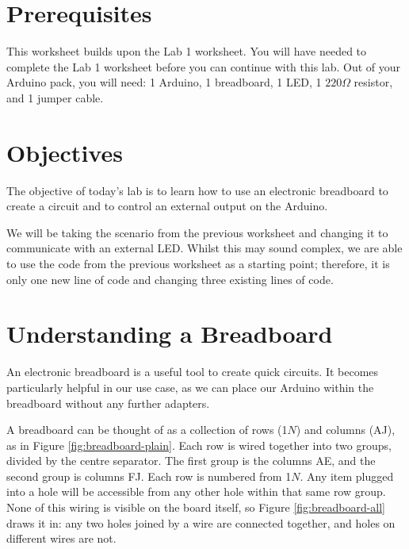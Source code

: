 \documentclass[11pt,a4paper]{article}
\begin{document}
\pagestyle{fancy}

\section*{Prerequisites}
This worksheet builds upon the Lab 1 worksheet. You will have needed to complete the Lab 1 worksheet before you can continue with this lab. Out of your Arduino pack, you will need: 1 Arduino, 1 breadboard, 1 LED, 1 $220\Omega$ resistor, and 1 jumper cable.

\section*{Objectives}
The objective of today's lab is to learn how to use an electronic breadboard to create a circuit and to control an external output on the Arduino.

We will be taking the scenario from the previous worksheet and changing it to communicate with an external LED. Whilst this may sound complex, we are able to use the code from the previous worksheet as a starting point; therefore, it is only one new line of code and changing three existing lines of code.

\section{Understanding a Breadboard}
An electronic breadboard is a useful tool to create quick circuits. It becomes particularly helpful in our use case, as we can place our Arduino within the breadboard without any further adapters.

A breadboard can be thought of as a collection of rows (1\textrightarrow $N$) and columns (A\textrightarrow J), as in Figure \ref{fig:breadboard-plain}. Each row is wired together into two groups, divided by the centre separator. The first group is the columns A\textrightarrow E, and the second group is columns F\textrightarrow J. Each row is numbered from 1\textrightarrow $N$. Any item plugged into a hole will be accessible from any other hole within that same row group. None of this wiring is visible on the board itself, so Figure \ref{fig:breadboard-all} draws it in: any two holes joined by a wire are connected together, and holes on different wires are not.
\end{document}
